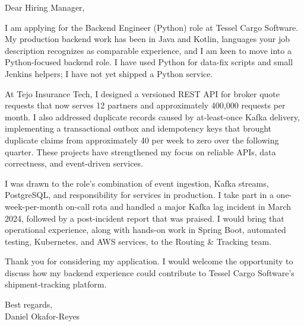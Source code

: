 \documentclass[11pt,a4paper]{article}
\begin{document}
\noindent Dear Hiring Manager,

\medskip
\noindent I am applying for the Backend Engineer (Python) role at Tessel Cargo Software. My production backend work has been in Java and Kotlin, languages your job description recognizes as comparable experience, and I am keen to move into a Python-focused backend role. I have used Python for data-fix scripts and small Jenkins helpers; I have not yet shipped a Python service.

\medskip
\noindent At Tejo Insurance Tech, I designed a versioned REST API for broker quote requests that now serves 12 partners and approximately 400,000 requests per month. I also addressed duplicate records caused by at-least-once Kafka delivery, implementing a transactional outbox and idempotency keys that brought duplicate claims from approximately 40 per week to zero over the following quarter. These projects have strengthened my focus on reliable APIs, data correctness, and event-driven services.

\medskip
\noindent I was drawn to the role's combination of event ingestion, Kafka streams, PostgreSQL, and responsibility for services in production. I take part in a one-week-per-month on-call rota and handled a major Kafka lag incident in March 2024, followed by a post-incident report that was praised. I would bring that operational experience, along with hands-on work in Spring Boot, automated testing, Kubernetes, and AWS services, to the Routing & Tracking team.

\medskip
\noindent Thank you for considering my application. I would welcome the opportunity to discuss how my backend experience could contribute to Tessel Cargo Software's shipment-tracking platform.

\medskip
\noindent Best regards,\\
Daniel Okafor-Reyes
\end{document}
